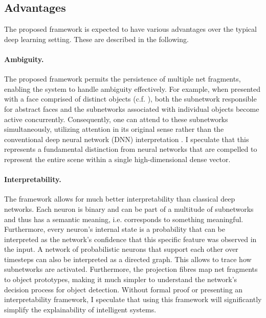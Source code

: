 \subsection{Advantages}
The proposed framework is expected to have various advantages over the typical deep learning setting. These are described in the following.

\paragraph{Ambiguity.} The proposed framework permits the persistence of multiple net fragments, enabling the system to handle ambiguity effectively. For example, when presented with a face comprised of distinct objects (c.f. ), both the subnetwork responsible for abstract faces and the subnetworks associated with individual objects become active concurrently. Consequently, one can attend to these subnetworks simultaneously, utilizing attention in its original sense rather than the conventional deep neural network (DNN) interpretation . I speculate that this represents a fundamental distinction from neural networks that are compelled to represent the entire scene within a single high-dimensional dense vector.

\paragraph{Interpretability.} The framework allows for much better interpretability than classical deep networks. Each neuron is binary and can be part of a multitude of subnetworks and thus has a semantic meaning, i.e. corresponds to something meaningful. Furthermore, every neuron's internal state is a probability that can be interpreted as the network's confidence that this specific feature was observed in the input. A network of probabilistic neurons that support each other over timesteps can also be interpreted as a directed graph. This allows to trace how subnetworks are activated. 
Furthermore, the projection fibres map net fragments to object prototypes, making it much simpler to understand the network's decision process for object detection.
Without formal proof or presenting an interpretability framework, I speculate that using this framework will significantly simplify the explainability of intelligent systems.

